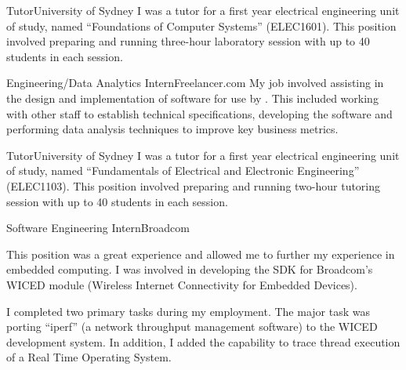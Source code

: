 \begin{professionalExperience}

{Tutor}{University of Sydney}
{I was a tutor for a first year electrical engineering unit of study, named
``Foundations of Computer Systems'' (ELEC1601). This position involved preparing
and running three-hour laboratory session with up to 40 students in each
session.}
{}

{Engineering/Data Analytics Intern}{Freelancer.com}
{My job involved assisting in the design and implementation of software for use
by . This included working with other staff to establish
technical specifications, developing the software and performing data analysis
techniques to improve key business metrics.}
{



}

{Tutor}{University of Sydney}
{I was a tutor for a first year electrical engineering unit of study, named
``Fundamentals of Electrical and Electronic Engineering'' (ELEC1103). This
position involved preparing and running two-hour tutoring session with up to 40
students in each session.}
{}

{Software Engineering Intern}{Broadcom}
{This position was a great experience and allowed me to further my experience in
embedded computing. I was involved in developing the SDK for Broadcom's WICED
module (Wireless Internet Connectivity for Embedded Devices).

I completed two primary tasks during my employment. The major task was porting
``iperf'' (a network throughput management software) to the WICED development
system. In addition, I added the capability to trace thread execution of a Real
Time Operating System.}
{

}
\end{professionalExperience}
